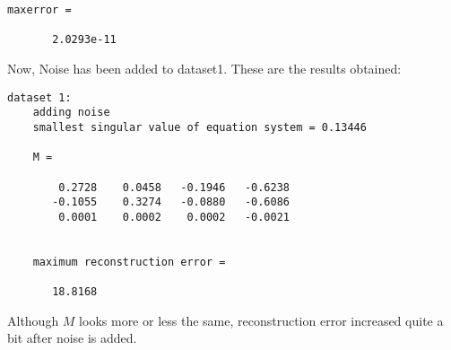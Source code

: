\documentclass[11pt]{article}
\begin{document}
\begin{enumerate}
\begin{itemize}
\begin{Verbatim}[frame=single]
	maxerror =

	   2.0293e-11
	\end{Verbatim}

	Now, Noise has been added to dataset1. These are the results obtained: 
	\begin{Verbatim}[frame=single]
	dataset 1: 
	adding noise
	smallest singular value of equation system = 0.13446

	M =

	    0.2728    0.0458   -0.1946   -0.6238
	   -0.1055    0.3274   -0.0880   -0.6086
	    0.0001    0.0002    0.0002   -0.0021


	maximum reconstruction error =

	   18.8168
	\end{Verbatim}

	Although $M$ looks more or less the same, reconstruction error increased quite a bit after noise is added.
\end{itemize}



\end{enumerate}
\end{document}
